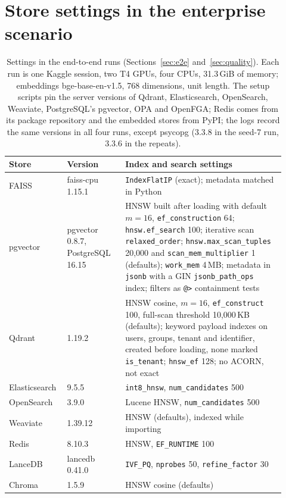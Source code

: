 
\section{Store settings in the enterprise scenario}\label{app:settings}

\begin{table}[!htbp]
\centering
\scriptsize
\setlength{\tabcolsep}{4pt}
\begin{tabular}{@{}p{0.17\linewidth}p{0.2\linewidth}p{0.55\linewidth}@{}}
\toprule
Store & Version & Index and search settings \\
\midrule
FAISS & faiss-cpu 1.15.1 &\texttt{IndexFlatIP} (exact); metadata matched in Python \\
pgvector & pgvector 0.8.7, PostgreSQL 16.15 & HNSW built after loading with default $m = 16$,
  \texttt{ef\_construction} 64; \texttt{hnsw.ef\_search} 100; iterative scan \texttt{relaxed\_order};
  \texttt{hnsw.max\_scan\_tuples} 20,000 and \texttt{scan\_mem\_multiplier} 1 (defaults);
  \texttt{work\_mem} 4\,MB; metadata in \texttt{jsonb} with a GIN \texttt{jsonb\_path\_ops} index;
  filters as \texttt{@>} containment tests \\
Qdrant & 1.19.2 & HNSW cosine, $m = 16$, \texttt{ef\_construct} 100, full-scan threshold 10,000\,KB
  (defaults); keyword payload indexes on users, groups, tenant and identifier, created before
  loading, none marked \texttt{is\_tenant}; \texttt{hnsw\_ef} 128; no ACORN, not exact \\
Elasticsearch & 9.5.5 & \texttt{int8\_hnsw}, \texttt{num\_candidates} 500 \\
OpenSearch & 3.9.0 & Lucene HNSW, \texttt{num\_candidates} 500 \\
Weaviate & 1.39.12 & HNSW (defaults), indexed while importing \\
Redis & 8.10.3 & HNSW, \texttt{EF\_RUNTIME} 100 \\
LanceDB & lancedb 0.41.0 & \texttt{IVF\_PQ}, \texttt{nprobes} 50, \texttt{refine\_factor} 30 \\
Chroma & 1.5.9 & HNSW cosine (defaults) \\
\bottomrule
\end{tabular}
\caption{Settings in the end-to-end runs (Sections~\ref{sec:e2e} and~\ref{sec:quality}). Each run is
one Kaggle session, two T4 GPUs, four CPUs, 31.3\,GiB of memory; embeddings bge-base-en-v1.5, 768
dimensions, unit length. The setup scripts pin the server versions of Qdrant, Elasticsearch,
OpenSearch, Weaviate, PostgreSQL's pgvector, OPA and OpenFGA; Redis comes from its package repository
and the embedded stores from PyPI; the logs record the same versions in all four runs, except psycopg (3.3.8 in the seed-7 run,
3.3.6 in the repeats).}
\label{tab:app-x0-settings}
\end{table}

